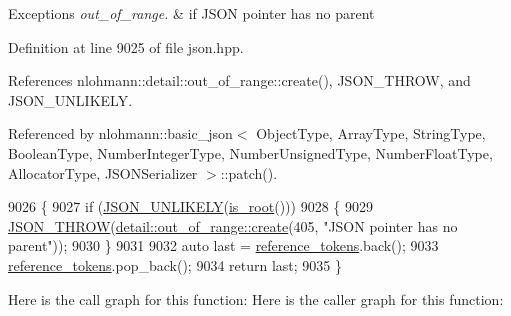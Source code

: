 \begin{DoxyExceptions}{Exceptions}
{\em out\+\_\+of\+\_\+range.} & if J\+S\+ON pointer has no parent \\
\hline
\end{DoxyExceptions}


Definition at line 9025 of file json.\+hpp.



References nlohmann\+::detail\+::out\+\_\+of\+\_\+range\+::create(), J\+S\+O\+N\+\_\+\+T\+H\+R\+OW, and J\+S\+O\+N\+\_\+\+U\+N\+L\+I\+K\+E\+LY.



Referenced by nlohmann\+::basic\+\_\+json$<$ Object\+Type, Array\+Type, String\+Type, Boolean\+Type, Number\+Integer\+Type, Number\+Unsigned\+Type, Number\+Float\+Type, Allocator\+Type, J\+S\+O\+N\+Serializer $>$\+::patch().


\begin{DoxyCode}
9026     \{
9027         \textcolor{keywordflow}{if} (\hyperlink{json_8hpp_ab77582407c64944e7db1ea95ab520253}{JSON\_UNLIKELY}(\hyperlink{classnlohmann_1_1json__pointer_aa7cd421aaccabea7ffcf953f7ff96362}{is\_root}()))
9028         \{
9029             \hyperlink{json_8hpp_a6c274f6db2e65c1b66c7d41b06ad690f}{JSON\_THROW}(\hyperlink{classnlohmann_1_1detail_1_1out__of__range_a3f6d82a6f967c4728a1ec735a7867073}{detail::out\_of\_range::create}(405, \textcolor{stringliteral}{"JSON
       pointer has no parent"}));
9030         \}
9031 
9032         \textcolor{keyword}{auto} last = \hyperlink{classnlohmann_1_1json__pointer_a07a990a6838de4f38ee9d881e7b9fd61}{reference\_tokens}.back();
9033         \hyperlink{classnlohmann_1_1json__pointer_a07a990a6838de4f38ee9d881e7b9fd61}{reference\_tokens}.pop\_back();
9034         \textcolor{keywordflow}{return} last;
9035     \}
\end{DoxyCode}
Here is the call graph for this function\+:
Here is the caller graph for this function\+:
\mbox{\label{classnlohmann_1_1json__pointer_aa7649d30da9fc10b0e20704a27aea2a9}} 
